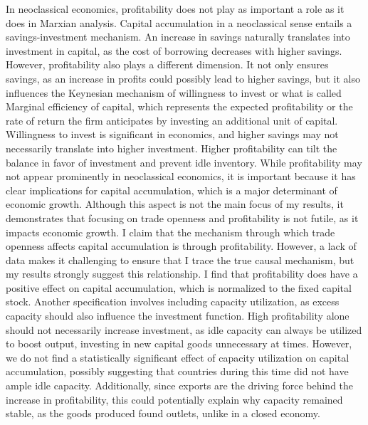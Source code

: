 \documentclass[10pt]{article}
\begin{document}
\par In neoclassical economics, profitability does not play as important a role as it does in Marxian analysis. Capital accumulation in a neoclassical sense entails a savings-investment mechanism. An increase in savings naturally translates into investment in capital, as the cost of borrowing decreases with higher savings. However, profitability also plays a different dimension. It not only ensures savings, as an increase in profits could possibly lead to higher savings, but it also influences the Keynesian mechanism of willingness to invest or what is called Marginal efficiency of capital, which represents the expected profitability or the rate of return the firm anticipates by investing an additional unit of capital. Willingness to invest is significant in economics, and higher savings may not necessarily translate into higher investment. Higher profitability can tilt the balance in favor of investment and prevent idle inventory. While profitability may not appear prominently in neoclassical economics, it is important because it has clear implications for capital accumulation, which is a major determinant of economic growth. Although this aspect is not the main focus of my results, it demonstrates that focusing on trade openness and profitability is not futile, as it impacts economic growth. I claim that the mechanism through which trade openness affects capital accumulation is through profitability. However, a lack of data makes it challenging to ensure that I trace the true causal mechanism, but my results strongly suggest this relationship. I find that profitability does have a positive effect on capital accumulation, which is normalized to the fixed capital stock. Another specification involves including capacity utilization, as excess capacity should also influence the investment function. High profitability alone should not necessarily increase investment, as idle capacity can always be utilized to boost output, investing in new capital goods unnecessary at times. However, we do not find a statistically significant effect of capacity utilization on capital accumulation, possibly suggesting that countries during this time did not have ample idle capacity. Additionally, since exports are the driving force behind the increase in profitability, this could potentially explain why capacity remained stable, as the goods produced found outlets, unlike in a closed economy. 
\begin{center}
\end{center}
\end{document}
